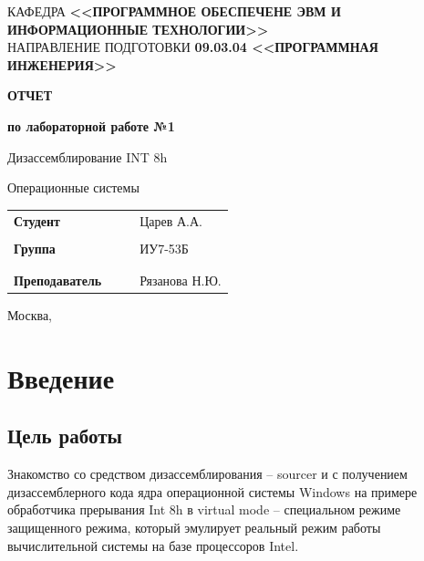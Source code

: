\documentclass[14pt, a4paper]{article}
\begin{document}
	\noindent
	\small КАФЕДРА {\bf<<ПРОГРАММНОЕ ОБЕСПЕЧЕНЕ ЭВМ И ИНФОРМАЦИОННЫЕ ТЕХНОЛОГИИ>>}\\
	
	\noindent
	\small НАПРАВЛЕНИЕ ПОДГОТОВКИ {\bf 09.03.04 <<ПРОГРАММНАЯ ИНЖЕНЕРИЯ>>}\\
	
	\vspace{3cm}

	\noindent
	\begin{minipage}{\linewidth}
		\centering\large\bf{ОТЧЕТ}

		\centering\bf{по лабораторной работе №1}
	\end{minipage}
	
	\vspace{2cm}
	
	 Дизассемблирование INT 8h
	
	\bigbreak
	
	 Операционные системы
	
	\vspace{2cm}
	
	\noindent
	\begin{center}
		\begin{tabularx}{\linewidth}{XXXX}
			\bf Студент &&& Царев А.А.\\
			&&&\\
			\bf Группа &&& ИУ7-53Б\\
			&&&\\
			&&&\\
			\bf Преподаватель &&& Рязанова Н.Ю.\\
		\end{tabularx}
	
		\vfill
		
		Москва, \the\year
	\end{center}
	
	\pagebreak
		
	\section*{Введение}
	
	\subsection*{Цель работы}
	
	Знакомство со средством дизассемблирования – sourcer и с получением дизассемблерного кода ядра операционной системы Windows на примере обработчика прерывания Int 8h в virtual mode – специальном режиме защищенного режима, который эмулирует реальный режим работы вычислительной системы на базе процессоров Intel.
	
\end{document}
